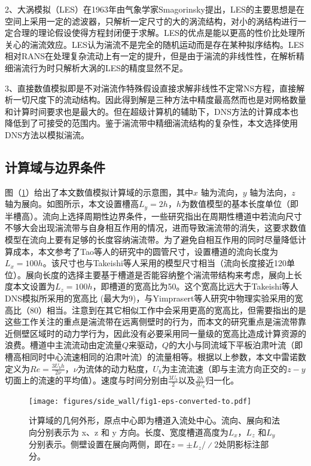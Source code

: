 2、大涡模拟（LES）在1963年由气象学家Smagorinsky提出，LES的主要思想是在空间上采用一定的滤波器，只解析一定尺寸的大的涡流结构，对小的涡结构进行一定合理的理论假设使得方程封闭便于求解。LES的优点是能以更高的性价比处理所关心的湍流效应。LES认为湍流不是完全的随机运动而是存在某种拟序结构。LES相对RANS在处理复杂流动上有一定的提升，但是由于湍流的非线性性，在解析精细湍流行为时只解析大涡的LES的精度显然不足。

3、直接数值模拟即是不对湍流作特殊假设直接求解非线性不定常NS方程，直接解析一切尺度下的流动结构。因此得到解是三种方法中精度最高然而也是对网格数量和计算时间要求也是最大的。但在超级计算机的辅助下，DNS方法的计算成本也降低到了可接受的范围内。鉴于湍流带中精细湍流结构的复杂性，本文选择使用DNS方法以模拟湍流。


\subsection{计算域与边界条件}
图（\ref{fig:base_model}）给出了本文数值模拟计算域的示意图，其中$x$ 轴为流向，$y$ 轴为法向，$z$ 轴为展向。如图所示，本文设置槽高$L_y = 2h$，$h$为数值模型的基本长度单位（即半槽高）。流向上选择周期性边界条件，一些研究指出在周期性槽道中若流向尺寸不够大会出现湍流带与自身相互作用的情况，进而导致湍流带的消失\cite{Tao2018}，这要求数值模型在流向上要有足够的长度容纳湍流带。为了避免自相互作用的同时尽量降低计算成本，本文参考了Tao等人的研究中的圆管尺寸\cite{Tao2018}，设置槽道的流向长度为$L_x = 100h$。该尺寸也与Takeishi等人采用的模型尺寸相当（流向长度接近120单位）\cite{Takeishi2015}。展向长度的选择主要基于槽道是否能容纳整个湍流带结构来考虑，展向上长度本文设置为$L_z = 100h$，即槽道的宽高比为50。这个宽高比远大于Takeishi等人DNS模拟所采用的宽高比 (最大为9)\cite{Takeishi2015}，与Yimprasert等人研究\cite{Yimprasert2021}中物理实验采用的宽高比（80）相当。注意到在其它相似工作\cite{Paranjape2019, Sano2016}中会采用更高的宽高比，但需要指出的是这些工作关注的重点是湍流带在远离侧壁时的行为，而本文的研究重点是湍流带靠近侧壁区域时的动力学行为，因此没有必要采用同一量级的宽高比造成计算资源的浪费。槽道中主流流动由定流量$Q$来驱动，$Q$的大小与同流域下平板泊肃叶流（即槽高相同时中心流速相同的泊肃叶流）的流量相等。根据以上参数，本文中雷诺数定义为$Re=\frac{3U_bh}{2\nu}$，$\nu$为流体的动力粘度，$U_b$为主流流速（即与主流方向正交的$z-y$切面上的流速的平均值）。速度与时间分别由$\frac{3U_b}{2}$以及$\frac{2h}{3U_b}$归一化。

\begin{figure}
    \centering
    \texttt{[image: figures/side\_wall/fig1-eps-converted-to.pdf]}
    \caption{计算域的几何外形，原点中心即为槽道入流处中心。流向、展向和法向分别表示为 x、z 和 y 方向。长度、宽度槽道高度为$L_x$，$L_z$ 和$L_y$分别表示。侧壁设置在展向两侧，即在$z = ±L_z/∕2$处阴影标注部分。}
    \label{fig:base_model}
\end{figure}

